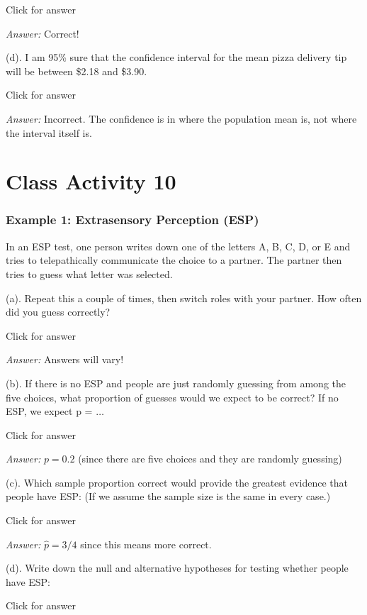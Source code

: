 \documentclass[
]{book}
\begin{document}
Click for answer

\emph{Answer:} Correct!

(d). I am 95\% sure that the confidence interval for the mean pizza delivery tip will be between \$2.18 and \$3.90.

Click for answer

\emph{Answer:} Incorrect. The confidence is in where the population mean is, not where the interval itself is.

\hypertarget{class-activity-10}{%
\chapter{Class Activity 10}\label{class-activity-10}}

\hypertarget{example-1-extrasensory-perception-esp}{%
\subsection{Example 1: Extrasensory Perception (ESP)}\label{example-1-extrasensory-perception-esp}}

In an ESP test, one person writes down one of the letters A, B, C, D, or E and tries to telepathically communicate the choice to a partner. The partner then tries to guess what letter was selected.

(a). Repeat this a couple of times, then switch roles with your partner. How often did you guess correctly?

Click for answer

\emph{Answer:} Answers will vary!

(b). If there is no ESP and people are just randomly guessing from among the five choices, what proportion of guesses would we expect to be correct? If no ESP, we expect p = \(\ldots\)

Click for answer

\emph{Answer:} \(p = 0.2\) (since there are five choices and they are randomly guessing)

(c). Which sample proportion correct would provide the greatest evidence that people have ESP: (If we assume the sample size is the same in every case.)

Click for answer

\emph{Answer:}
\(\hat{p} = 3/4\) since this means more correct.

(d). Write down the null and alternative hypotheses for testing whether people have ESP:

Click for answer
\end{document}
